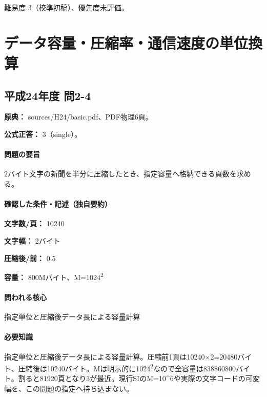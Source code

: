 \par 難易度 3（校準初稿）、優先度未評価。

\section{データ容量・圧縮率・通信速度の単位換算}

\subsection{平成24年度 問2-4}
\label{q:h24-reg-basic-2-4}

\noindent\textbf{原典：} sources/H24/basic.pdf、PDF物理6頁。

\textbf{公式正答：} 3（single）。

\paragraph{問題の要旨} 2バイト文字の新聞を半分に圧縮したとき、指定容量へ格納できる頁数を求める。

\paragraph{確認した条件・記述（独自要約）}\mbox{}\par

\noindent\textbf{文字数/頁：} 10240\par

\noindent\textbf{文字幅：} 2バイト\par

\noindent\textbf{圧縮後/前：} 0.5\par

\noindent\textbf{容量：} 800Mバイト、M=\allowbreak{}1024\textsuperscript{2}\par

\paragraph{問われる核心} 指定単位と圧縮後データ長による容量計算

\paragraph{必要知識} 指定単位と圧縮後データ長による容量計算。圧縮前1頁は10240×2=\allowbreak{}20480バイト、圧縮後は10240バイト。Mは明示的に1024\textsuperscript{2}なので全容量は838860800バイト。割ると81920頁となり3が最近。現行SIのM=\allowbreak{}10\textasciicircum{}6や実際の文字コードの可変幅を、この問題の指定へ持ち込まない。

